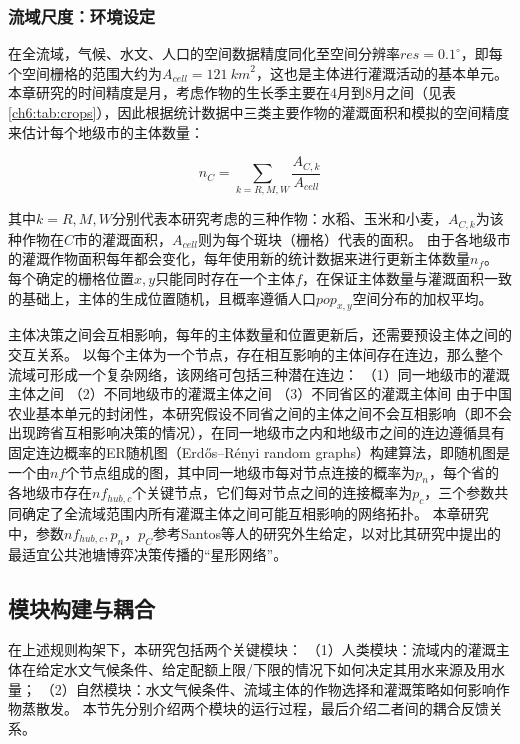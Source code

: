 \subsubsection{流域尺度：环境设定}

在全流域，气候、水文、人口的空间数据精度同化至空间分辨率$res = 0.1^{\circ}$，即每个空间栅格的范围大约为$A_{cell} = 121~{km}^2$，这也是主体进行灌溉活动的基本单元。
本章研究的时间精度是月，考虑作物的生长季主要在$4$月到$8$月之间（见表\ref{ch6:tab:crops}），因此根据统计数据中三类主要作物的灌溉面积和模拟的空间精度来估计每个地级市的主体数量：

\begin{equation}
    n_{C} = \sum_{k=R, M, W}\frac{A_{C, k}}{A_{cell}}
\end{equation}

其中$k = R, M, W$分别代表本研究考虑的三种作物：水稻、玉米和小麦，$A_{C, k}$为该种作物在$C$市的灌溉面积，$A_{cell}$则为每个斑块（栅格）代表的面积。
由于各地级市的灌溉作物面积每年都会变化，每年使用新的统计数据来进行更新主体数量$n_f$。
每个确定的栅格位置$x, y$只能同时存在一个主体$f$，在保证主体数量与灌溉面积一致的基础上，主体的生成位置随机，且概率遵循人口$pop_{x, y}$空间分布的加权平均。

主体决策之间会互相影响，每年的主体数量和位置更新后，还需要预设主体之间的交互关系。
以每个主体为一个节点，存在相互影响的主体间存在连边，那么整个流域可形成一个复杂网络，该网络可包括三种潜在连边：
（1）同一地级市的灌溉主体之间
（2）不同地级市的灌溉主体之间
（3）不同省区的灌溉主体间
由于中国农业基本单元的封闭性，本研究假设不同省之间的主体之间不会互相影响（即不会出现跨省互相影响决策的情况），在同一地级市之内和地级市之间的连边遵循具有固定连边概率的ER随机图（Erdős–Rényi random graphs）构建算法，即随机图是一个由$nf$个节点组成的图，其中同一地级市每对节点连接的概率为$p_n$，每个省的各地级市存在$nf_{hub, c}$个关键节点，它们每对节点之间的连接概率为$p_c$，三个参数共同确定了全流域范围内所有灌溉主体之间可能互相影响的网络拓扑。
本章研究中，参数$nf_{hub, c}, p_n$，$p_C$参考Santos等人的研究外生给定\cite{santos2008}，以对比其研究中提出的最适宜公共池塘博弈决策传播的“星形网络”。



\subsection{模块构建与耦合}

在上述规则构架下，本研究包括两个关键模块：
（1）人类模块：流域内的灌溉主体在给定水文气候条件、给定配额上限/下限的情况下如何决定其用水来源及用水量；
（2）自然模块：水文气候条件、流域主体的作物选择和灌溉策略如何影响作物蒸散发。
本节先分别介绍两个模块的运行过程，最后介绍二者间的耦合反馈关系。

